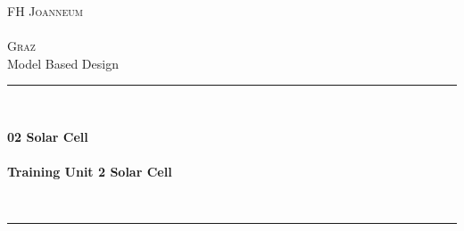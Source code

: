 \thispagestyle{empty}


\begin{titlepage}

	\begin{center}
	
	\textsc{
		\LARGE FH Joanneum\\~\\Graz}\\[1.5cm]
	\vfill{}
	\large Model Based Design
	\\[0.5cm]
	\newcommand{\HRule}{\rule{\linewidth}{0.5mm}}
	\HRule
	\\[0.4cm]
	{
	
		\Huge \bfseries 02 Solar Cell \\
	        ~\\
	        \large Training Unit 2 Solar Cell }
	\\[0.4cm]
	\HRule
	\\[0.5cm]
	
	
	\vfill{}
	

\end{center}
\end{titlepage}
